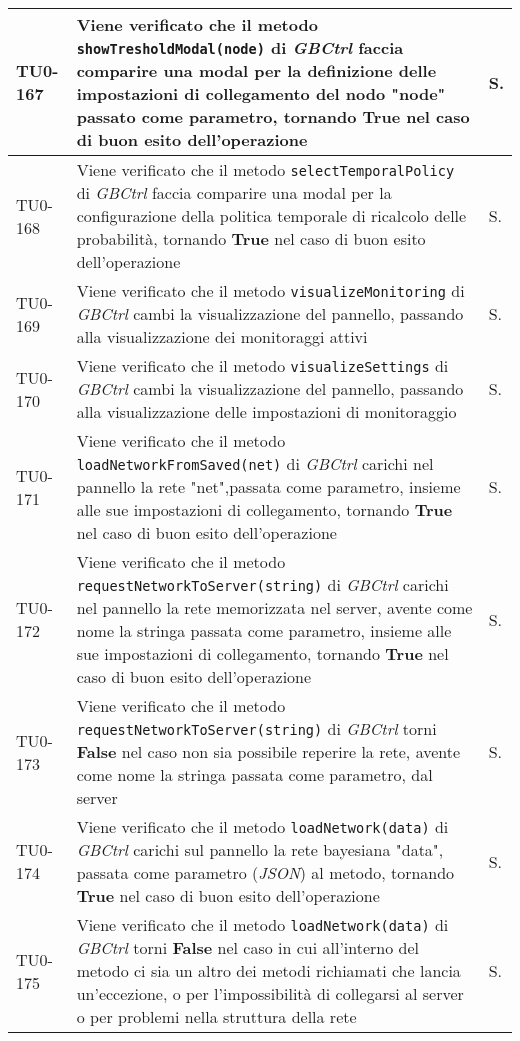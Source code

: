 \begin{longtable}{|C{.15\textwidth}|m{.66\textwidth}|C{.10\textwidth}|}
\hline
{}TU0-167 & Viene verificato che il metodo \texttt{showTresholdModal(node)} di \textit{GBCtrl} faccia comparire una modal per la definizione delle impostazioni di collegamento del nodo "node" passato come parametro, tornando \textbf{True} nel caso di buon esito dell'operazione & S.\\
\hline
TU0-168 & Viene verificato che il metodo \texttt{selectTemporalPolicy} di \textit{GBCtrl} faccia comparire una modal per la configurazione della politica temporale di ricalcolo delle probabilità, tornando \textbf{True} nel caso di buon esito dell'operazione & S.\\
\hline
{}TU0-169 & Viene verificato che il metodo \texttt{visualizeMonitoring} di \textit{GBCtrl} cambi la visualizzazione del pannello, passando alla visualizzazione dei monitoraggi attivi & S.\\
\hline
TU0-170 & Viene verificato che il metodo \texttt{visualizeSettings} di \textit{GBCtrl} cambi la visualizzazione del pannello, passando alla visualizzazione delle impostazioni di monitoraggio & S.\\
\hline
{}TU0-171 & Viene verificato che il metodo \texttt{loadNetworkFromSaved(net)} di \textit{GBCtrl} carichi nel pannello la rete "net",passata come parametro, insieme alle sue impostazioni di collegamento, tornando \textbf{True} nel caso di buon esito dell'operazione & S.\\
\hline
TU0-172 & Viene verificato che il metodo \texttt{requestNetworkToServer(string)} di \textit{GBCtrl} carichi nel pannello la rete memorizzata nel server, avente come nome la stringa passata come parametro, insieme alle sue impostazioni di collegamento, tornando \textbf{True} nel caso di buon esito dell'operazione & S.\\
\hline
{}TU0-173 & Viene verificato che il metodo \texttt{requestNetworkToServer(string)} di \textit{GBCtrl} torni \textbf{False} nel caso non sia possibile reperire la rete, avente come nome la stringa passata come parametro, dal server & S.\\
\hline
TU0-174 & Viene verificato che il metodo \texttt{loadNetwork(data)} di \textit{GBCtrl} carichi sul pannello la rete bayesiana "data", passata come parametro (\textit{JSON}) al metodo, tornando \textbf{True} nel caso di buon esito dell'operazione & S.\\
\hline
{}TU0-175 & Viene verificato che il metodo \texttt{loadNetwork(data)} di \textit{GBCtrl} torni \textbf{False} nel caso in cui all'interno del metodo ci sia un altro dei metodi richiamati che lancia un'eccezione, o per l'impossibilità di collegarsi al server o per problemi nella struttura della rete  & S.\\

\end{longtable}
